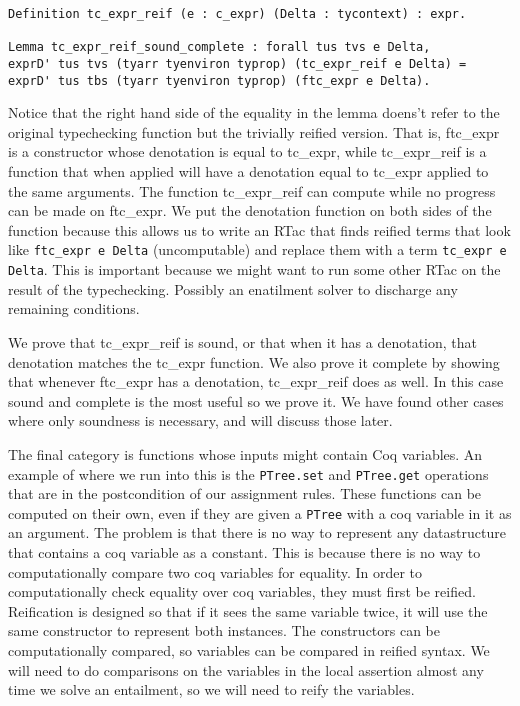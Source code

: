 \documentclass{puthesis}
\begin{document}
\begin{lstlisting}
Definition tc_expr_reif (e : c_expr) (Delta : tycontext) : expr.

Lemma tc_expr_reif_sound_complete : forall tus tvs e Delta,
exprD' tus tvs (tyarr tyenviron typrop) (tc_expr_reif e Delta) =
exprD' tus tbs (tyarr tyenviron typrop) (ftc_expr e Delta).
\end{lstlisting}

Notice that the right hand side of the equality in the lemma doens't
refer to the original typechecking function but the trivially reified
version. That is, ftc_expr is a constructor whose denotation is equal
to tc_expr, while tc_expr_reif is a function that when applied will have
a denotation equal to tc_expr applied to the same arguments. The function
tc_expr_reif can compute while no progress can be made on ftc_expr.
We put the denotation function on both sides of the function because
this allows us to write an RTac that finds reified terms that look like
\lstinline|ftc_expr e Delta| (uncomputable) and replace them with a term
\lstinline|tc_expr e Delta|. This is important because we might want
to run some other RTac on the result of the typechecking. Possibly
an enatilment solver to discharge any remaining conditions. 

We prove that tc_expr_reif is sound, or that when it has a denotation,
that denotation matches the tc_expr function. We also prove it complete by
showing that whenever ftc_expr has a denotation, tc_expr_reif does as well.
In this case sound and complete is the most useful so we prove it. We have
found other cases where only soundness is necessary, and will discuss those
later.

The final category is functions whose inputs might contain Coq variables. An example
of where we run into this is the \lstinline|PTree.set| and \lstinline|PTree.get|
operations that are in the postcondition of our assignment rules. These functions
can be computed on their own, even if they are given a \lstinline|PTree| with a
coq variable in it as an argument. The problem is that there is no way to represent
any datastructure that contains a coq variable as a constant. This is because there
is no way to computationally compare two coq variables for equality. In order to 
computationally check equality over coq variables, they must first be reified.
Reification is designed so that if it sees the same variable twice, it will use
the same constructor to represent both instances. The constructors can be 
computationally compared, so variables can be compared in reified syntax.
We will need to do comparisons on the variables in the local assertion almost
any time we solve an entailment, so we will need to reify the variables.
\end{document}
